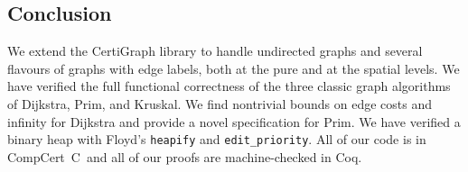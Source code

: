 \vspace*{-0.25em}
\subsection{Conclusion}
\vspace*{-0.25em}

We extend the CertiGraph library to handle undirected graphs and several flavours of graphs with edge labels, both at the pure and at the spatial levels.  We have verified the full functional correctness of the three classic graph algorithms of Dijkstra, Prim, and Kruskal.  We find nontrivial bounds on edge costs and infinity for Dijkstra and provide a novel specification for Prim.  We have verified a binary heap with Floyd's \texttt{heapify} and \texttt{edit\_priority}.  
All of our code is in CompCert~C~and all of our proofs are machine-checked in Coq.












